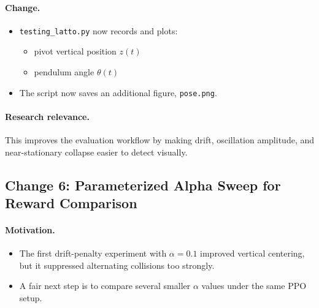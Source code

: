 \documentclass[11pt]{article}
\begin{document}
\paragraph{Change.}
\begin{itemize}[leftmargin=1.5em]
  \item \texttt{testing\_latto.py} now records and plots:
  \begin{itemize}[leftmargin=1.5em]
    \item pivot vertical position $z(t)$
    \item pendulum angle $\theta(t)$
  \end{itemize}
  \item The script now saves an additional figure, \texttt{pose.png}.
\end{itemize}

\paragraph{Research relevance.}
This improves the evaluation workflow by making drift, oscillation amplitude, and near-stationary collapse easier to detect visually.

\subsection*{Change 6: Parameterized Alpha Sweep for Reward Comparison}

\paragraph{Motivation.}
\begin{itemize}[leftmargin=1.5em]
  \item The first drift-penalty experiment with $\alpha = 0.1$ improved vertical centering, but it suppressed alternating collisions too strongly.
  \item A fair next step is to compare several smaller $\alpha$ values under the same PPO setup.
\end{itemize}
\end{document}
